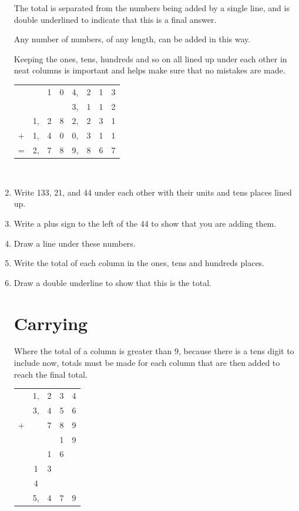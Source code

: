 \documentclass{article}
\begin{document}
\begin{enumerate}
The total is separated from the numbers being added by a single line, and is double underlined to indicate that this is a final answer.

Any number of numbers, of any length, can be added in this way.

Keeping the ones, tens, hundreds and so on all lined up under each other in neat columns is important and helps make sure that no mistakes are made.\\

\begin{center}
\begin{tabular}{c@{\,}c@{\,}c@{\,}c@{\,}c@{\,}c@{\,}c@{\,}c@{\,}}
 & &1&0&4,&2&1&3\\
 & & & &3,&1&1&2\\
 &1,&2&8&2,&2&3&1\\
+&1,&4&0&0,&3&1&1\\
\hline
=&2,&7&8&9,&8&6&7\\
\hline
\hline
\end{tabular}\\
\end{center}

\item Write 133, 21, and 44 under each other with their units and tens places lined up.
\item Write a plus sign to the left of the 44 to show that you are adding them.
\item Draw a line under these numbers.
\item Write the total of each column in the ones, tens and hundreds places.
\item Draw a double underline to show that this is the total.

\section*{Carrying}
Where the total of a column is greater than 9, because there is a tens digit to include now, totals must be made for each column that are then added to reach the final total.\\

\begin{center}
\begin{tabular}{c@{\,}c@{\,}c@{\,}c@{\,}c}
     &1,&2&3&4\\
     &3,&4&5&6\\
   + & &7&8&9\\
\hline
     & & &1&9\\
     & & 1&6&\\
     & 1& 3&&\\
     & 4& & &\\
\hline
     &5,&4&7&9\\
\hline
\hline
\end{tabular}\\
\end{center}


\end{enumerate}
\end{document}
